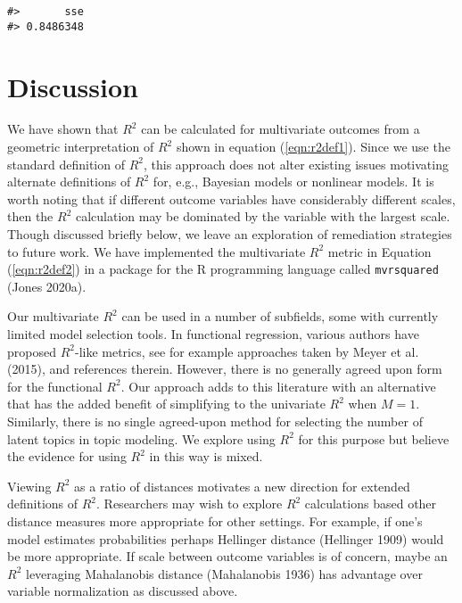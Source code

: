\begin{verbatim}
#>       sse 
#> 0.8486348
\end{verbatim}

\hypertarget{discussion}{%
\section{Discussion}\label{discussion}}

We have shown that \(R^2\) can be calculated for multivariate outcomes from a geometric interpretation of \(R^2\) shown in equation (\ref{eqn:r2def1}). Since we use the standard definition of \(R^2\), this approach does not alter existing issues motivating alternate definitions of \(R^2\) for, e.g., Bayesian models or nonlinear models. It is worth noting that if different outcome variables have considerably different scales, then the \(R^2\) calculation may be dominated by the variable with the largest scale. Though discussed briefly below, we leave an exploration of remediation strategies to future work. We have implemented the multivariate \(R^2\) metric in Equation (\ref{eqn:r2def2}) in a package for the R programming language called \texttt{mvrsquared} (Jones 2020a).

Our multivariate \(R^2\) can be used in a number of subfields, some with currently limited model selection tools. In functional regression, various authors have proposed \(R^2\)-like metrics, see for example approaches taken by Meyer et al. (2015), and references therein. However, there is no generally agreed upon form for the functional \(R^2\). Our approach adds to this literature with an alternative that has the added benefit of simplifying to the univariate \(R^2\) when \(M = 1\). Similarly, there is no single agreed-upon method for selecting the number of latent topics in topic modeling. We explore using \(R^2\) for this purpose but believe the evidence for using \(R^2\) in this way is mixed.

Viewing \(R^2\) as a ratio of distances motivates a new direction for extended definitions of \(R^2\). Researchers may wish to explore \(R^2\) calculations based other distance measures more appropriate for other settings. For example, if one's model estimates probabilities perhaps Hellinger distance (Hellinger 1909) would be more appropriate. If scale between outcome variables is of concern, maybe an \(R^2\) leveraging Mahalanobis distance (Mahalanobis 1936) has advantage over variable normalization as discussed above.

\newpage{}

